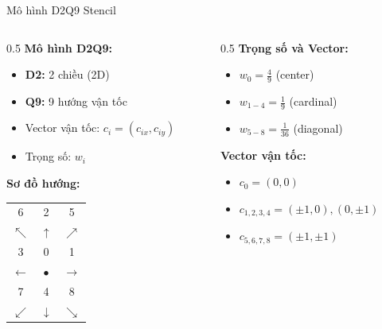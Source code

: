 \documentclass[t, aspectratio=169]{beamer}
\begin{document}
	\begin{frame}{Mô hình D2Q9 Stencil}
		\begin{columns}[T]
			\begin{column}{0.5\textwidth}
				\textbf{Mô hình D2Q9:}
				\begin{itemize}
					\item \textbf{D2:} 2 chiều (2D)
					\item \textbf{Q9:} 9 hướng vận tốc
					\item Vector vận tốc: $c_i = (c_{ix}, c_{iy})$
					\item Trọng số: $w_i$
				\end{itemize}
				
				\vspace{1em}
				
				\textbf{Sơ đồ hướng:}
				\begin{center}
					\begin{tabular}{ccc}
						6 & 2 & 5 \\
						$\nwarrow$ & $\uparrow$ & $\nearrow$ \\
						3 & 0 & 1 \\
						$\leftarrow$ & $\bullet$ & $\rightarrow$ \\
						7 & 4 & 8 \\
						$\swarrow$ & $\downarrow$ & $\searrow$ \\
					\end{tabular}
				\end{center}
			\end{column}
			
			\begin{column}{0.5\textwidth}
				\textbf{Trọng số và Vector:}
				\begin{itemize}
					\item $w_0 = \frac{4}{9}$ (center)
					\item $w_{1-4} = \frac{1}{9}$ (cardinal)
					\item $w_{5-8} = \frac{1}{36}$ (diagonal)
				\end{itemize}
				
				\vspace{1em}
				
				\textbf{Vector vận tốc:}
				\begin{itemize}
					\item $c_0 = (0, 0)$
					\item $c_{1,2,3,4} = (\pm1, 0), (0, \pm1)$
					\item $c_{5,6,7,8} = (\pm1, \pm1)$
				\end{itemize}
			\end{column}
		\end{columns}
	\end{frame}
	
\end{document}
